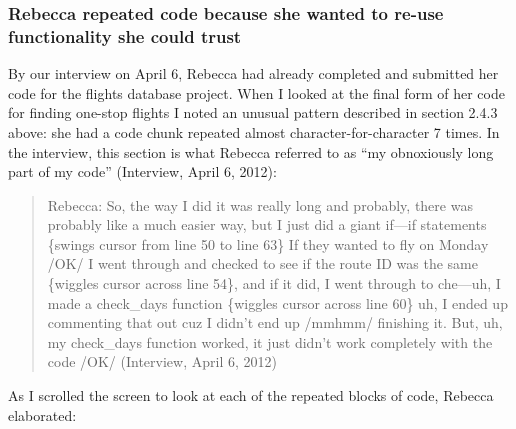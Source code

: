 \subsubsection{Rebecca repeated code because she wanted to re-use functionality she could trust}\label{rebecca-repeated-code-because-she-wanted-to-re-use-functionality-she-could-trust}

By our interview on April 6, Rebecca had already completed and submitted her code for the flights database project. When I looked at the final form of her code for finding one-stop flights I noted an unusual pattern described in section 2.4.3 above: she had a code chunk repeated almost character-for-character 7 times. In the interview, this section is what Rebecca referred to as ``my obnoxiously long part of my code'' (Interview, April 6, 2012):

\begin{quote}
  Rebecca: So, the way I did it was really long and probably, there was probably like a much easier way, but I just did a giant if---if statements \{swings cursor from line 50 to line 63\} If they wanted to fly on Monday /OK/ I went through and checked to see if the route ID was the same \{wiggles cursor across line 54\}, and if it did, I went through to che---uh, I made a check\_days function \{wiggles cursor across line 60\} uh, I ended up commenting that out cuz I didn't end up /mmhmm/ finishing it. But, uh, my check\_days function worked, it just didn't work completely with the code /OK/ (Interview, April 6, 2012)
\end{quote}

As I scrolled the screen to look at each of the repeated blocks of code, Rebecca elaborated:

